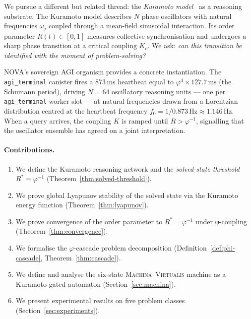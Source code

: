 \documentclass[12pt]{article}
\newcommand{\PHI}{\varphi}
\newcommand{\PHIINV}{\varphi^{-1}}
\newcommand{\MV}{\textsc{Machina~Virtualis}}
\begin{document}
We pursue a different but related thread: the \emph{Kuramoto model}~\cite{Kuramoto1984}
as a reasoning substrate.  The Kuramoto model describes $N$ phase oscillators
with natural frequencies $\omega_j$ coupled through a mean-field sinusoidal
interaction.  Its order parameter $R(t) \in [0, 1]$ measures collective
synchronisation and undergoes a sharp phase transition at a critical coupling
$K_c$.  We ask: \emph{can this transition be identified with the moment of
problem-solving?}

NOVA's sovereign AGI organism provides a concrete instantiation.  The
\texttt{agi\_terminal} canister fires a 873\,ms heartbeat equal to
$\PHI^4 \times 127.7\,\mathrm{ms}$ (the Schumann period), driving $N = 64$
oscillatory reasoning units — one per \texttt{agi\_terminal} worker slot — at
natural frequencies drawn from a Lorentzian distribution centred at the
heartbeat frequency $f_0 = 1/0.873\,\mathrm{Hz} \approx 1.146\,\mathrm{Hz}$.
When a query arrives, the coupling $K$ is ramped until $R > \PHIINV$, signalling
that the oscillator ensemble has agreed on a joint interpretation.

\paragraph{Contributions.}
\begin{enumerate}[label=(\roman*)]
  \item We define the Kuramoto reasoning network and the \emph{solved-state
        threshold} $R^* = \PHIINV$ (Theorem~\ref{thm:solved-threshold}).
  \item We prove global Lyapunov stability of the solved state via the Kuramoto
        energy function (Theorem~\ref{thm:lyapunov}).
  \item We prove convergence of the order parameter to $R^* = \PHIINV$ under
        φ-coupling (Theorem~\ref{thm:convergence}).
  \item We formalise the $\varphi$-cascade problem decomposition
        (Definition~\ref{def:phi-cascade}, Theorem~\ref{thm:cascade}).
  \item We define and analyse the six-state \MV{} machine as a Kuramoto-gated
        automaton (Section~\ref{sec:machina}).
  \item We present experimental results on five problem classes
        (Section~\ref{sec:experiments}).
\end{enumerate}

\end{document}
